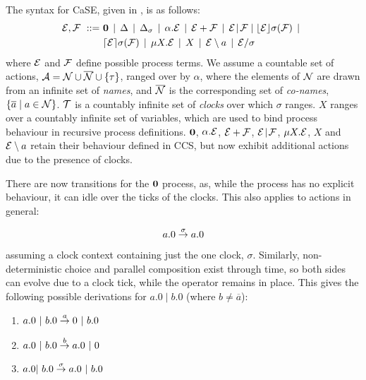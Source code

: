 The syntax for CaSE, given in \cite{norton05alg}, is as follows:
\begin{equation}
  \begin{aligned}
    \text{$\mathcal{E}$}, \text{$\mathcal{F}$}\ ::=\ &
    \textbf{0}  \;\,|\,\; 
    \Delta \;\,|\,\; 
    \Delta_{\sigma} \;\,|\,\; 
    \alpha . \text{$\mathcal{E}$}  \;\,|\,\;
    \text{$\mathcal{E}$} + \text{$\mathcal{F}$} \;\,|\,\; 
   \text{$\mathcal{E}$} \mathrel{\!|\!} \text{$\mathcal{F}$} \mid
    \lfloor{\text{$\mathcal{E}$}}\rfloor {\sigma} ({\text{$\mathcal{F}$}}) \;\,|\,\; \\
    & \lceil{\text{$\mathcal{E}$}}\rceil {\sigma} ({\text{$\mathcal{F}$}}) \;\,|\,\; 
    \mu X . \text{$\mathcal{E}$} \;\,|\,\; 
    X \;\,|\,\; 
    \text{$\mathcal{E}$} \setminus a \;\,|\,\; 
    \text{$\mathcal{E}$} / \sigma
  \end{aligned}
\end{equation}
where $\text{$\mathcal{E}$}$ and $\text{$\mathcal{F}$}$ define possible process terms. We assume a
countable set of actions, $\text{$\mathcal{A}$} = \text{$\mathcal{N}$} \cup \text{$\overline{\text{$\mathcal{N}$}}$} \cup
\{\tau\}$, ranged over by $\alpha$, where the elements of $\text{$\mathcal{N}$}$ are
drawn from an infinite set of \emph{names}, and $\text{$\overline{\text{$\mathcal{N}$}}$}$ is the
corresponding set of \emph{co-names}, $\{\overline{a} \mid a \in
\text{$\mathcal{N}$}\}$. $\text{$\mathcal{T}$}$ is a countably infinite set of \emph{clocks} over
which $\sigma$ ranges. $X$ ranges over a countably infinite set of
variables, which are used to bind process behaviour in recursive
process definitions. $\textbf{0}$, $\alpha . \text{$\mathcal{E}$}$, $\text{$\mathcal{E}$} + \text{$\mathcal{F}$}$,
$\text{$\mathcal{E}$} \mathrel{\!|\!} \text{$\mathcal{F}$}$, $\mu X . \text{$\mathcal{E}$}$, $X$ and $\text{$\mathcal{E}$}
\setminus a$ retain their behaviour defined in CCS, but now exhibit
additional actions due to the presence of clocks.

There are now transitions for the $\textbf{0}$ process, as, while the
process has no explicit behaviour, it can idle over the ticks of the
clocks.  This also applies to actions in general:

\begin{equation}
a.0 \stackrel{\sigma}{\rightarrow} a.0
\end{equation}

\noindent assuming a clock context containing just the one clock,
$\sigma$. Similarly, non-deterministic choice and parallel composition
exist through time, so both sides can evolve due to a clock tick,
while the operator remains in place.  This gives the following
possible derivations for $a.0\;|\;b.0$ (where $b \ne \overline{a}$):

\begin{enumerate}
\item $a.0\ |\ b.0 \derives{a} 0\ |\ b.0$
\item $a.0\ |\ b.0 \derives{b} a.0\ |\ 0$
\item $a.0 |\ b.0 \derives{\sigma} a.0\ |\ b.0$
\end{enumerate}

